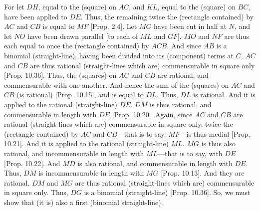 \begin{Parallel}{}{}
{For let $DH$, equal to the (square) on $AC$,  and $KL$, equal to the
(square) on $BC$, have been applied to $DE$. Thus, the remaining twice
the (rectangle contained) by $AC$ and $CB$ is equal to $MF$ [Prop. 2.4].  Let $MG$ have been cut in half
at $N$, and let $NO$ have been drawn parallel [to each of $ML$ and
$GF$]. $MO$ and $NF$ are thus each equal to once the (rectangle contained)
by $ACB$. And since $AB$ is a binomial (straight-line), having been divided into its (component) terms at $C$,  $AC$ and $CB$ are thus rational (straight-lines which are) commensurable in square only [Prop. 10.36]. Thus, the (squares) on $AC$ and $CB$ are rational, and commensurable with one another.  And hence the
sum of the (squares) on $AC$ and $CB$ (is rational) [Prop. 10.15], and is equal to $DL$. Thus, $DL$
is rational. And it is applied to the rational (straight-line) $DE$. $DM$
is thus rational, and commensurable in length with $DE$ [Prop. 10.20]. Again, since $AC$ and $CB$
are rational (straight-lines which are) commensurable in square only, twice the (rectangle contained) by $AC$ and $CB$---that is to say, $MF$---is thus medial [Prop. 10.21]. And it is applied to the
rational (straight-line) $ML$. $MG$ is thus also rational, and incommensurable in length with $ML$---that is to say, with $DE$
[Prop. 10.22].  And $MD$ is also rational, and
commensurable in length with $DE$. Thus, $DM$ is  incommensurable in length with $MG$ [Prop. 10.13]. And
they are rational. $DM$ and $MG$ are thus rational (straight-lines which
are) commensurable in square only. Thus, $DG$ is a binomial (straight-line)
[Prop. 10.36]. So, we must show that (it is)
also a first (binomial straight-line).

}
\end{Parallel}
